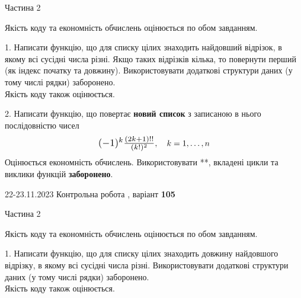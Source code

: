\documentclass[12pt, ukrainian]{article}
\begin{document}
{{{\begin {Huge}
\begin{center}Частина 2
\end{center}
\vspace{10mm}
\end {Huge}

{
\begin {Large}
Якість коду та економність обчислень оцінюється по обом завданням.

\vspace{5mm}

1. Написати функцію, що для списку цілих знаходить найдовший відрізок, в якому всі сусідні числа різні. Якщо таких відрізків кілька, то повернути перший (як індекс початку та довжину). Використовувати додаткові структури даних (у тому числі рядки) заборонено.\\	Якість коду також оцінюється. 



\vspace{10mm}



2. 
Написати функцію, що повертає \textbf{новий список} з записаною в нього послідовністю чисел
$$\scalebox{1.2}{$(-1)^{k}\frac{(2k+1)!!}{(k!)^2}$}, \quad k=1,\ldots,n$$
Оцінюється економність обчислень. Використовувати **, вкладені цикли та виклики функцій \textbf{заборонено}.

\end{Large}\newpage




\begin {Huge}
{{22-23.11.2023 Контрольна робота , варіант  \No \textbf { 105 }\par}}

\begin{center}Частина 2
\end{center}
\vspace{10mm}
\end {Huge}

{
\begin {Large}
Якість коду та економність обчислень оцінюється по обом завданням.

\vspace{5mm}

1. Написати функцію, що для списку цілих знаходить довжину найдовшого відрізку, в якому всі сусідні числа різні. Використовувати додаткові структури даних (у тому числі рядки) заборонено.\\	Якість коду також оцінюється. 




\end{Large}}}}}}
\end{document}
